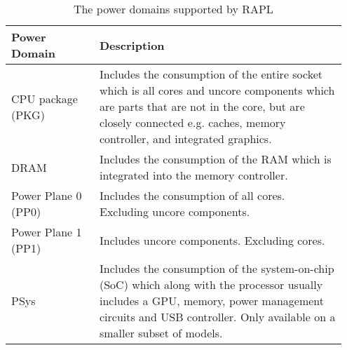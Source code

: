 \begin{table}[ht]
    \begin{tabular}{| p{0.25\linewidth} | p{0.7\linewidth}|}
    \hline
    \textbf{Power Domain}  & \textbf{Description}                            \\ \hline
    CPU package (PKG)        & Includes the consumption of the entire socket which is all cores and uncore components which are parts that are not in the core, but are closely connected e.g. caches, memory controller, and integrated graphics.       \\ \hline
    DRAM                & Includes the consumption of the RAM which is integrated into the memory controller.                       \\ \hline
    Power Plane 0 (PP0)                 & Includes the consumption of all cores. Excluding uncore components.               \\ \hline
    Power Plane 1 (PP1)      & Includes uncore components. Excluding cores.           \\ \hline
    PSys & Includes the consumption of the system-on-chip (SoC) which along with the processor usually includes a GPU, memory, power management circuits and USB controller. Only available on a smaller subset of models.       \\ \hline
    \end{tabular}
    \caption{The power domains supported by RAPL}
    \label{tab:RAPL_Domain}
    \end{table}